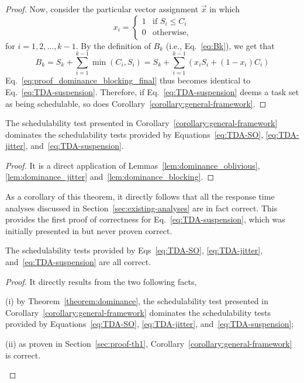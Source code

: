 \begin{proof}
    
    Now, consider the particular vector assignment $\vec{x}$ in which 
  \begin{equation*}
    x_i =
    \begin{cases}
      1 &\mbox{if } S_i \leq    C_i\\
      0 & \mbox{otherwise},
    \end{cases}
  \end{equation*}
  for $i=1,2,\ldots,k-1$. 
    By the definition of $B_k$ (i.e., Eq.~\eqref{eq:Bk}), we get that 
    $$B_k = S_k + \sum_{i=1}^{k-1} \min(C_i, S_i) = S_k + \sum_{i=1}^{k-1} \left(x_i
    S_i + (1-x_i) C_i\right)$$
Eq.~\eqref{eq:proof_dominance_blocking_final} thus becomes identical to Eq.~\eqref{eq:TDA-suspension}. Therefore, if Eq.~\eqref{eq:TDA-suspension} deems a task set as being schedulable, so does Corollary~\ref{corollary:general-framework}. 
\end{proof}

\begin{theorem}
  \label{theorem:dominance}
  The schedulability test presented in Corollary~\ref{corollary:general-framework} dominates the schedulability tests provided by Equations~\eqref{eq:TDA-SO}, \eqref{eq:TDA-jitter}, and~\eqref{eq:TDA-suspension}.
\end{theorem}
\begin{proof}
It is a direct application of Lemmas~\ref{lem:dominance_oblivious}, \ref{lem:dominance_jitter} and~\ref{lem:dominance_blocking}.
\end{proof}


As a corollary of this theorem, it directly follows that all the response time analyses discussed in Section~\ref{sec:existing-analyses} are in fact correct. This provides the first proof of correctness for Eq.~\eqref{eq:TDA-suspension}, which was initially presented in \cite{Liu:2000:RS:518501} but never proven correct.

\begin{theorem}
  \label{theorem:correctness_soa}
  The schedulability tests provided by Eqs~\eqref{eq:TDA-SO}, \eqref{eq:TDA-jitter}, and~\eqref{eq:TDA-suspension} are all correct.
\end{theorem}
\begin{proof}
It directly results from the two following facts,
\begin{compactitem}
\item[(i)] by Theorem~\ref{theorem:dominance}, the schedulability test presented in Corollary~\ref{corollary:general-framework} dominates the schedulability tests provided by Equations~\eqref{eq:TDA-SO}, \eqref{eq:TDA-jitter}, and~\eqref{eq:TDA-suspension};
\item [(ii)] as proven in Section~\ref{sec:proof-th1}, Corollary~\ref{corollary:general-framework} is correct.
\end{compactitem}
\end{proof}
